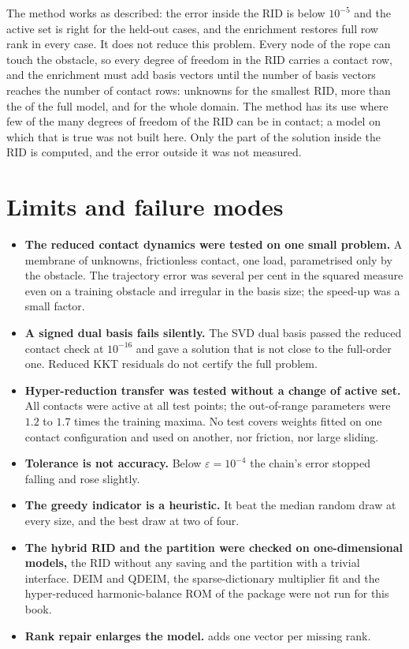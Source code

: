 The method works as described: the error inside the RID is below $10^{-5}$ and the active set is right for the held-out cases, and the enrichment restores full row rank in every case. It does not reduce this problem. Every node of the rope can touch the obstacle, so every degree of freedom in the RID carries a contact row, and the enrichment must add basis vectors until the number of basis vectors reaches the number of contact rows: \crdOneUnk{} unknowns for the smallest RID, more than the \crdN{} of the full model, and \crdFullUnk{} for the whole domain. The method has its use where few of the many degrees of freedom of the RID can be in contact; a model on which that is true was not built here. Only the part of the solution inside the RID is computed, and the error outside it was not measured.

\section{Limits and failure modes}\label{sec:hy-limits}

\begin{limitsbox}
\begin{itemize}
\item \textbf{The reduced contact dynamics were tested on one small problem.} A membrane of \chdN{} unknowns, frictionless contact, one load, parametrised only by the obstacle. The trajectory error was several per cent in the squared measure even on a training obstacle and irregular in the basis size; the speed-up was a small factor.
\item \textbf{A signed dual basis fails silently.} The SVD dual basis passed the reduced contact check at $10^{-16}$ and gave a solution that is not close to the full-order one. Reduced KKT residuals do not certify the full problem.
\item \textbf{Hyper-reduction transfer was tested without a change of active set.} All contacts were active at all test points; the out-of-range parameters were $1.2$ to $1.7$ times the training maxima. No test covers weights fitted on one contact configuration and used on another, nor friction, nor large sliding.
\item \textbf{Tolerance is not accuracy.} Below $\varepsilon=10^{-4}$ the chain's error stopped falling and rose slightly.
\item \textbf{The greedy indicator is a heuristic.} It beat the median random draw at every size, and the best draw at two of four.
\item \textbf{The hybrid RID and the partition were checked on one-dimensional models,} the RID without any saving and the partition with a trivial interface. DEIM and QDEIM, the sparse-dictionary multiplier fit and the hyper-reduced harmonic-balance ROM of the package were not run for this book.
\item \textbf{Rank repair enlarges the model.}  adds one vector per missing rank.
\end{itemize}
\end{limitsbox}

